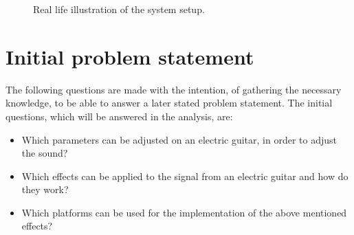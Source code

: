 
\begin{figure}[htbp!]
\centering
\def\svgwidth{\columnwidth}
\scalebox{0.7}{}
\caption{Real life illustration of the system setup.}
		\label{fig:real_life_drawing}
\end{figure}

\section{Initial problem statement}
The following questions are made with the intention, of gathering the necessary knowledge, to be able to answer a later stated problem statement. The initial questions, which will be answered in the analysis, are:

\begin{itemize}
\item Which parameters can be adjusted on an electric guitar, in order to adjust the sound?
\item Which effects can be applied to the signal from an electric guitar and how do they work?
\item Which platforms can be used for the implementation of the above mentioned effects? 
\end{itemize}